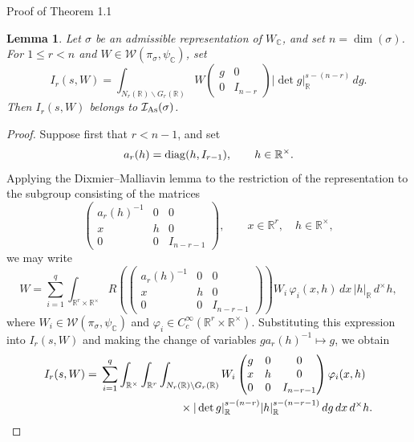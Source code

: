 \documentclass[12pt,reqno]{amsart}
\numberwithin{equation}{section}%
\numberwithin{equation}{subsection}
\newtheorem{lemma}[equation]{Lemma}
\theoremstyle{definition}
\theoremstyle{remark}
\begin{document}
\begin{section}{Proof of Theorem 1.1}
\begin{lemma}
\label{lem:partial-flicker-integrals}
Let $\sigma$ be an admissible representation of $W_{\mathbb C}$, and set
$n=\dim(\sigma)$. For $1\leq r<n$ and
$W\in\mathcal{W}(\pi_\sigma,\psi_{\mathbb C})$, set
\[
I_r(s,W)
=
\int_{N_r(\mathbb R)\backslash G_r(\mathbb R)}
W
\begin{pmatrix}
g&0\\
0&I_{n-r}
\end{pmatrix}
|\det g|_{\mathbb R}^{s-(n-r)}\,dg.
\]
Then $I_r(s,W)$ belongs to $\mathcal{I}_{{\rm As}}(\sigma)$. 
\end{lemma}

\begin{proof}
Suppose first that $r<n-1$, and set
\[
a_r(h)={\rm diag}(h,I_{r-1}),
\qquad h\in\mathbb R^\times.
\]
Applying the Dixmier--Malliavin lemma \cite[Lemma~6.1]{Jac2009} to the restriction of the
representation to the subgroup consisting of the matrices
\[
\begin{pmatrix}
a_r(h)^{-1}&0&0\\
x&h&0\\
0&0&I_{n-r-1}
\end{pmatrix},
\qquad
x\in\mathbb R^r,\quad h\in\mathbb R^\times,
\]
we may write
\[
W
=
\sum_{i=1}^q
\int_{\mathbb R^r\times\mathbb R^\times}
R\left(
\begin{pmatrix}
a_r(h)^{-1}&0&0\\
x&h&0\\
0&0&I_{n-r-1}
\end{pmatrix}
\right)
W_i\,
\varphi_i(x,h)\,dx\,|h|_{\mathbb R}\,d^\times h,
\]
where $W_i\in\mathcal{W}(\pi_\sigma,\psi_{\mathbb C})$ and 
$\varphi_i\in C_c^\infty(\mathbb R^r\times\mathbb R^\times).$
Substituting this expression into $I_r(s,W)$ and making the change of
variables $g a_r(h)^{-1}\mapsto g$, we obtain
\[
\begin{aligned}
I_r(s,W)
={}&
\sum_{i=1}^q
\int_{\mathbb R^\times}
\int_{\mathbb R^r}
\int_{N_r(\mathbb R)\backslash G_r(\mathbb R)}
W_i
\begin{pmatrix}
g&0&0\\
x&h&0\\
0&0&I_{n-r-1}
\end{pmatrix}
\varphi_i(x,h)                                     \\
&\hspace{25mm}\times
|\det g|_{\mathbb R}^{s-(n-r)}
|h|_{\mathbb R}^{s-(n-r-1)}
\,dg\,dx\,d^\times h.
\end{aligned}
\]


\end{proof}
\end{section}
\end{document}
